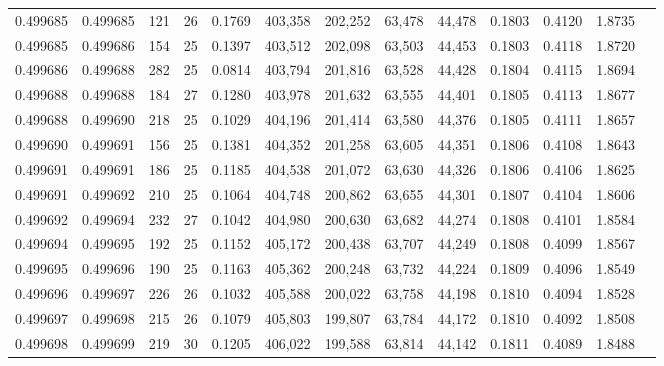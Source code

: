 \begin{tabular}{rrrrrrrrrrrrr}
0.499685 & 0.499685 & 121 &  26 &                                     0.1769 & 403,358 & 202,252 &  63,478 &  44,478 & 0.1803 & 0.4120 & 1.8735 \\
0.499685 & 0.499686 & 154 &  25 &                                     0.1397 & 403,512 & 202,098 &  63,503 &  44,453 & 0.1803 & 0.4118 & 1.8720 \\
0.499686 & 0.499688 & 282 &  25 &                                     0.0814 & 403,794 & 201,816 &  63,528 &  44,428 & 0.1804 & 0.4115 & 1.8694 \\
0.499688 & 0.499688 & 184 &  27 &                                     0.1280 & 403,978 & 201,632 &  63,555 &  44,401 & 0.1805 & 0.4113 & 1.8677 \\
0.499688 & 0.499690 & 218 &  25 &                                     0.1029 & 404,196 & 201,414 &  63,580 &  44,376 & 0.1805 & 0.4111 & 1.8657 \\
0.499690 & 0.499691 & 156 &  25 &                                     0.1381 & 404,352 & 201,258 &  63,605 &  44,351 & 0.1806 & 0.4108 & 1.8643 \\
0.499691 & 0.499691 & 186 &  25 &                                     0.1185 & 404,538 & 201,072 &  63,630 &  44,326 & 0.1806 & 0.4106 & 1.8625 \\
0.499691 & 0.499692 & 210 &  25 &                                     0.1064 & 404,748 & 200,862 &  63,655 &  44,301 & 0.1807 & 0.4104 & 1.8606 \\
0.499692 & 0.499694 & 232 &  27 &                                     0.1042 & 404,980 & 200,630 &  63,682 &  44,274 & 0.1808 & 0.4101 & 1.8584 \\
0.499694 & 0.499695 & 192 &  25 &                                     0.1152 & 405,172 & 200,438 &  63,707 &  44,249 & 0.1808 & 0.4099 & 1.8567 \\
0.499695 & 0.499696 & 190 &  25 &                                     0.1163 & 405,362 & 200,248 &  63,732 &  44,224 & 0.1809 & 0.4096 & 1.8549 \\
0.499696 & 0.499697 & 226 &  26 &                                     0.1032 & 405,588 & 200,022 &  63,758 &  44,198 & 0.1810 & 0.4094 & 1.8528 \\
0.499697 & 0.499698 & 215 &  26 &                                     0.1079 & 405,803 & 199,807 &  63,784 &  44,172 & 0.1810 & 0.4092 & 1.8508 \\
0.499698 & 0.499699 & 219 &  30 &                                     0.1205 & 406,022 & 199,588 &  63,814 &  44,142 & 0.1811 & 0.4089 & 1.8488 \\

\end{tabular}
